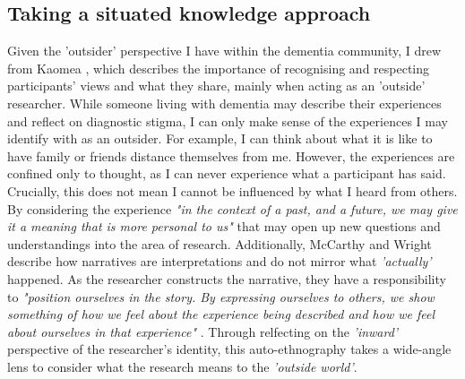 \subsection{Taking a situated knowledge approach}
\label{Relationships-Intro:SituatedKnowledge}
Given the 'outsider' perspective I have within the dementia community, I drew from Kaomea \citep{kaomea_dilemmas_2001}, which describes the importance of recognising and respecting participants' views and what they share, mainly when acting as an 'outside' researcher. While someone living with dementia may describe their experiences and reflect on diagnostic stigma, I can only make sense of the experiences I may identify with as an outsider. For example, I can think about what it is like to have family or friends distance themselves from me. However, the experiences are confined only to thought, as I can never experience what a participant has said. Crucially, this does not mean I cannot be influenced by what I heard from others. By considering the experience \textit{"in the context of a past, and a future, we may give it a meaning that is more personal to us"} \citep{mccarthy_technology_2007} that may open up new questions and understandings into the area of research. Additionally, McCarthy and Wright describe how narratives are interpretations and do not mirror what \textit{'actually'} happened. As the researcher constructs the narrative, they have a responsibility to \textit{"position ourselves in the story. By expressing ourselves to others, we show something of how we feel about the experience being described and how we feel about ourselves in that experience"} \citep{mccarthy_technology_2007}. Through relfecting on the \textit{'inward'} perspective of the researcher's identity, this auto-ethnography takes a wide-angle lens \citep{ellis_heartful_2016} to consider what the research means to the \textit{'outside world'}.


